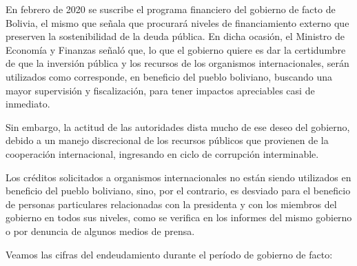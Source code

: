 \documentclass[a4paper, nobind]{templates/ociamthesis}
\begin{document}
En febrero de 2020 se suscribe el programa financiero del gobierno de facto de Bolivia, el mismo que señala que procurará niveles de financiamiento externo que preserven la sostenibilidad de la deuda pública. En dicha ocasión, el Ministro de Economía y Finanzas señaló que, lo que el gobierno quiere es dar la certidumbre de que la inversión pública y los recursos de los organismos internacionales, serán utilizados como corresponde, en beneficio del pueblo boliviano, buscando una mayor supervisión y fiscalización, para tener impactos apreciables casi de inmediato.

Sin embargo, la actitud de las autoridades dista mucho de ese deseo del gobierno, debido a un manejo discrecional de los recursos públicos que provienen de la cooperación internacional, ingresando en ciclo de corrupción interminable.

Los créditos solicitados a organismos internacionales no están siendo utilizados en beneficio del pueblo boliviano, sino, por el contrario, es desviado para el beneficio de personas particulares relacionadas con la presidenta y con los miembros del gobierno en todos sus niveles, como se verifica en los informes del mismo gobierno o por denuncia de algunos medios de prensa.

Veamos las cifras del endeudamiento durante el período de gobierno de facto:
\end{document}
